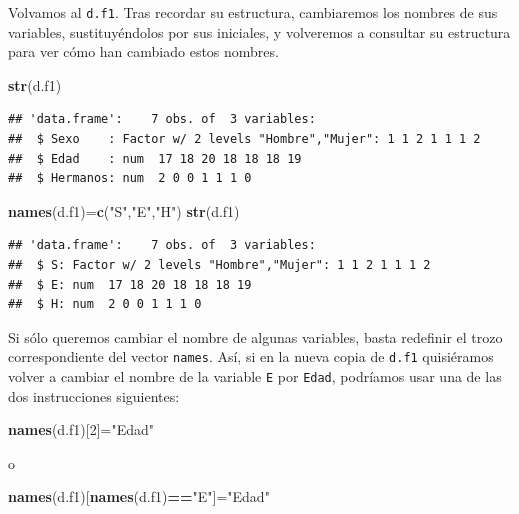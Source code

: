 \documentclass[]{book}
\newenvironment{Shaded}{\begin{snugshade}}{\end{snugshade}}
\newcommand{\DecValTok}[1]{\textcolor[rgb]{0.00,0.00,0.81}{#1}}
\newcommand{\KeywordTok}[1]{\textcolor[rgb]{0.13,0.29,0.53}{\textbf{#1}}}
\newcommand{\NormalTok}[1]{#1}
\newcommand{\OperatorTok}[1]{\textcolor[rgb]{0.81,0.36,0.00}{\textbf{#1}}}
\newcommand{\StringTok}[1]{\textcolor[rgb]{0.31,0.60,0.02}{#1}}
\theoremstyle{definition}
\theoremstyle{definition}
\theoremstyle{definition}
\theoremstyle{remark}
\begin{document}
Volvamos al \texttt{d.f1}. Tras recordar su estructura, cambiaremos los nombres de sus variables, sustituyéndolos por sus iniciales, y volveremos a consultar su estructura para ver cómo han cambiado estos nombres.

\begin{Shaded}
\begin{Highlighting}[]
\KeywordTok{str}\NormalTok{(d.f1)}
\end{Highlighting}
\end{Shaded}

\begin{verbatim}
## 'data.frame':    7 obs. of  3 variables:
##  $ Sexo    : Factor w/ 2 levels "Hombre","Mujer": 1 1 2 1 1 1 2
##  $ Edad    : num  17 18 20 18 18 18 19
##  $ Hermanos: num  2 0 0 1 1 1 0
\end{verbatim}

\begin{Shaded}
\begin{Highlighting}[]
\KeywordTok{names}\NormalTok{(d.f1)=}\KeywordTok{c}\NormalTok{(}\StringTok{"S"}\NormalTok{,}\StringTok{"E"}\NormalTok{,}\StringTok{"H"}\NormalTok{)}
\KeywordTok{str}\NormalTok{(d.f1)}
\end{Highlighting}
\end{Shaded}

\begin{verbatim}
## 'data.frame':    7 obs. of  3 variables:
##  $ S: Factor w/ 2 levels "Hombre","Mujer": 1 1 2 1 1 1 2
##  $ E: num  17 18 20 18 18 18 19
##  $ H: num  2 0 0 1 1 1 0
\end{verbatim}

Si sólo queremos cambiar el nombre de algunas variables, basta redefinir el trozo correspondiente del vector \texttt{names}. Así, si en la nueva copia de \texttt{d.f1} quisiéramos volver a cambiar el nombre de la variable \texttt{E} por \texttt{Edad}, podríamos usar una de las dos instrucciones siguientes:

\begin{Shaded}
\begin{Highlighting}[]
\KeywordTok{names}\NormalTok{(d.f1)[}\DecValTok{2}\NormalTok{]=}\StringTok{"Edad"}
\end{Highlighting}
\end{Shaded}

o

\begin{Shaded}
\begin{Highlighting}[]
\KeywordTok{names}\NormalTok{(d.f1)[}\KeywordTok{names}\NormalTok{(d.f1)}\OperatorTok{==}\StringTok{"E"}\NormalTok{]=}\StringTok{"Edad"}
\end{Highlighting}
\end{Shaded}
\end{document}
